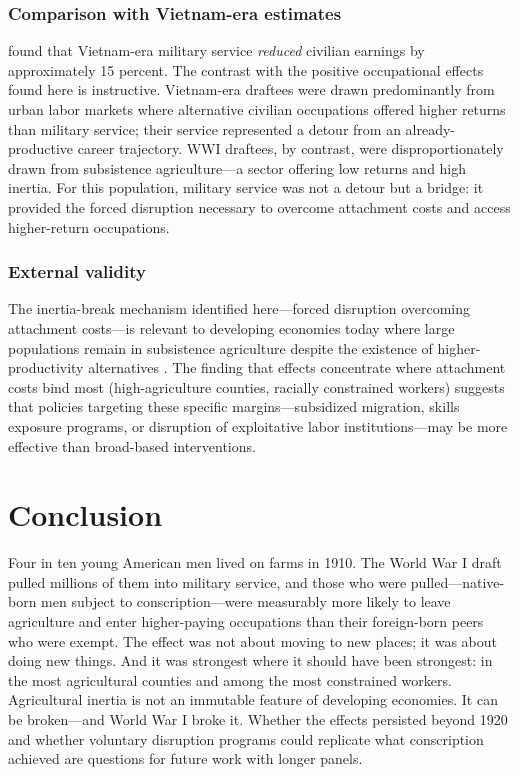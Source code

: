 \documentclass[12pt]{article}
\begin{document}
\subsubsection*{Comparison with Vietnam-era estimates} \citet{angrist1990} found that Vietnam-era military service \textit{reduced} civilian earnings by approximately 15 percent. The contrast with the positive occupational effects found here is instructive. Vietnam-era draftees were drawn predominantly from urban labor markets where alternative civilian occupations offered higher returns than military service; their service represented a detour from an already-productive career trajectory. WWI draftees, by contrast, were disproportionately drawn from subsistence agriculture---a sector offering low returns and high inertia. For this population, military service was not a detour but a bridge: it provided the forced disruption necessary to overcome attachment costs and access higher-return occupations.

\subsubsection*{External validity} The inertia-break mechanism identified here---forced disruption overcoming attachment costs---is relevant to developing economies today where large populations remain in subsistence agriculture despite the existence of higher-productivity alternatives \citep{bryan2014, lagakos2018}. The finding that effects concentrate where attachment costs bind most (high-agriculture counties, racially constrained workers) suggests that policies targeting these specific margins---subsidized migration, skills exposure programs, or disruption of exploitative labor institutions---may be more effective than broad-based interventions.

\section{Conclusion}

Four in ten young American men lived on farms in 1910. The World War I draft pulled millions of them into military service, and those who were pulled---native-born men subject to conscription---were measurably more likely to leave agriculture and enter higher-paying occupations than their foreign-born peers who were exempt. The effect was not about moving to new places; it was about doing new things. And it was strongest where it should have been strongest: in the most agricultural counties and among the most constrained workers. Agricultural inertia is not an immutable feature of developing economies. It can be broken---and World War I broke it. Whether the effects persisted beyond 1920 and whether voluntary disruption programs could replicate what conscription achieved are questions for future work with longer panels.
\end{document}
